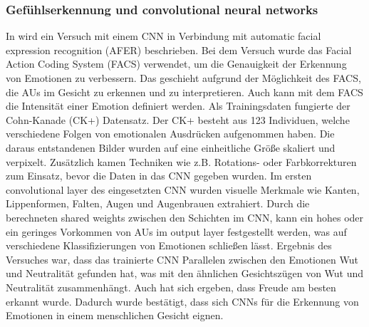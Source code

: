 \subsubsection*{Gefühlserkennung und convolutional neural networks}
In \cite{facialemotionrecusingcnn} wird ein Versuch mit einem CNN in Verbindung mit automatic facial expression recognition (AFER) beschrieben. Bei dem Versuch wurde das Facial Action Coding System (FACS) verwendet, um die Genauigkeit der Erkennung von Emotionen zu verbessern. Das geschieht aufgrund der Möglichkeit des FACS, die AUs im Gesicht zu erkennen und zu interpretieren. Auch kann mit dem FACS die Intensität einer Emotion definiert werden. Als Trainingsdaten fungierte der Cohn-Kanade (CK+) Datensatz. Der CK+ besteht aus 123 Individuen, welche verschiedene Folgen von emotionalen Ausdrücken aufgenommen haben. Die daraus entstandenen Bilder wurden auf eine einheitliche Größe skaliert und verpixelt. Zusätzlich kamen Techniken wie z.B. Rotations- oder Farbkorrekturen zum Einsatz, bevor die Daten in das CNN gegeben wurden. Im ersten convolutional layer des eingesetzten CNN wurden visuelle Merkmale wie Kanten, Lippenformen, Falten, Augen und Augenbrauen extrahiert. Durch die berechneten shared weights zwischen den Schichten im CNN, kann ein hohes oder ein geringes Vorkommen von AUs im output layer festgestellt werden, was auf verschiedene Klassifizierungen von Emotionen schließen lässt. Ergebnis des Versuches war, dass das trainierte CNN Parallelen zwischen den Emotionen Wut und Neutralität gefunden hat, was mit den ähnlichen Gesichtszügen von Wut und Neutralität zusammenhängt. Auch hat sich ergeben, dass Freude am besten erkannt wurde. Dadurch wurde bestätigt, dass sich CNNs für die Erkennung von Emotionen in einem menschlichen Gesicht eignen.
\\
\\
